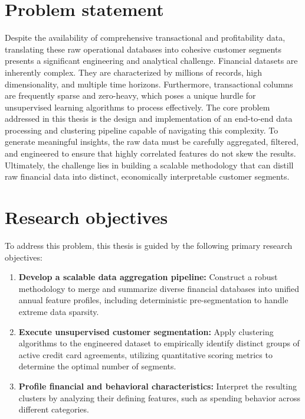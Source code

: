     \section{Problem statement}
    Despite the availability of comprehensive transactional and profitability data, translating these raw operational databases into cohesive customer segments presents a significant engineering and analytical challenge.
    Financial datasets are inherently complex. They are characterized by millions of records, high dimensionality, and multiple time horizons.
    Furthermore, transactional columns are frequently sparse and zero-heavy, which poses a unique hurdle for unsupervised learning algorithms to process effectively.
    The core problem addressed in this thesis is the design and implementation of an end-to-end data processing and clustering pipeline capable of navigating this complexity.
    To generate meaningful insights, the raw data must be carefully aggregated, filtered, and engineered to ensure that highly correlated features do not skew the results.
    Ultimately, the challenge lies in building a scalable methodology that can distill raw financial data into distinct, economically interpretable customer segments.
    
    \section{Research objectives}
    To address this problem, this thesis is guided by the following primary research objectives:
    
    \begin{enumerate}
        \item \textbf{Develop a scalable data aggregation pipeline:} Construct a robust methodology to merge and summarize diverse financial databases into unified annual feature profiles, including deterministic pre-segmentation to handle extreme data sparsity.
        \item \textbf{Execute unsupervised customer segmentation:} Apply clustering algorithms to the engineered dataset to empirically identify distinct groups of active credit card agreements, utilizing quantitative scoring metrics to determine the optimal number of segments.
        \item \textbf{Profile financial and behavioral characteristics:} Interpret the resulting clusters by analyzing their defining features, such as spending behavior across different categories.
    \end{enumerate}
    
